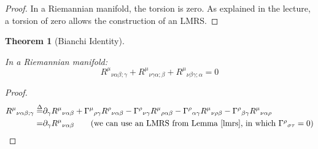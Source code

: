 \documentclass[10pt,a4paper]{article}
\newtheorem{theorem}{Theorem}
\begin{document}
		\begin{proof}
			In a Riemannian manifold, the torsion is zero. As explained in the lecture, a torsion of zero allows the construction of an LMRS.
		\end{proof}
		\begin{theorem}[Bianchi Identity]\label{bianci_identity}
			
			In a Riemannian manifold:
				\begin{equation}
			{R^\mu}_{\nu\alpha\beta;\gamma} +	{R^\mu}_{\nu\gamma\alpha;\beta} +	{R^\mu}_{\nu\beta\gamma;\alpha} = 0 \label{bianchi}
			\end{equation}
		\end{theorem}
		\begin{proof}
					\begin{align}
			{R^\mu}_{\nu\alpha\beta;\gamma} \overset{\Delta}{=}& \partial_{\gamma}{R^\mu}_{\nu\alpha\beta}+{\Gamma^\mu}_{\rho\gamma}{R^\rho}_{\nu\alpha\beta}-{\Gamma^\rho}_{\nu\gamma}{R^\mu}_{\rho\alpha\beta}-{\Gamma^\rho}_{\alpha\gamma}{R^\mu}_{\nu\rho\beta}-{\Gamma^\rho}_{\beta\gamma}{R^\mu}_{\nu\alpha\rho}\\
			=& \partial_{\gamma}{R^\mu}_{\nu\alpha\beta} \tag{we can use an LMRS from Lemma  \ref{lmrs}, in which ${\Gamma^{\rho}}_{\sigma\tau}=0$} \label{drop_gamma}
			\end{align}
			

\end{proof}
\end{document}
